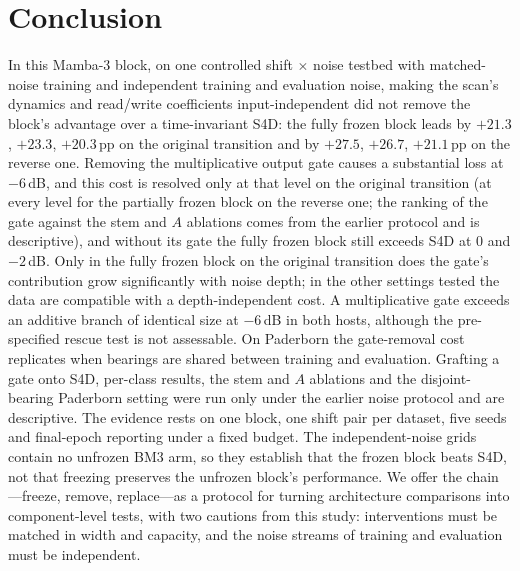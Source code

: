 \section{Conclusion}
\label{sec:conclusion}

In this Mamba-3 block, on one controlled shift $\times$ noise testbed with matched-noise training and independent training and evaluation noise, making the scan's dynamics and read/write coefficients input-independent did not remove the block's advantage over a time-invariant S4D: the fully frozen block leads by $+21.3$, $+23.3$, $+20.3$\,pp on the original transition and by $+27.5$, $+26.7$, $+21.1$\,pp on the reverse one. Removing the multiplicative output gate causes a substantial loss at $-6$\,dB, and this cost is resolved only at that level on the original transition (at every level for the partially frozen block on the reverse one; the ranking of the gate against the stem and $A$ ablations comes from the earlier protocol and is descriptive), and without its gate the fully frozen block still exceeds S4D at $0$ and $-2$\,dB. Only in the fully frozen block on the original transition does the gate's contribution grow significantly with noise depth; in the other settings tested the data are compatible with a depth-independent cost. A multiplicative gate exceeds an additive branch of identical size at $-6$\,dB in both hosts, although the pre-specified rescue test is not assessable. On Paderborn the gate-removal cost replicates when bearings are shared between training and evaluation. Grafting a gate onto S4D, per-class results, the stem and $A$ ablations and the disjoint-bearing Paderborn setting were run only under the earlier noise protocol and are descriptive. The evidence rests on one block, one shift pair per dataset, five seeds and final-epoch reporting under a fixed budget. The independent-noise grids contain no unfrozen BM3 arm, so they establish that the frozen block beats S4D, not that freezing preserves the unfrozen block's performance. We offer the chain---freeze, remove, replace---as a protocol for turning architecture comparisons into component-level tests, with two cautions from this study: interventions must be matched in width and capacity, and the noise streams of training and evaluation must be independent.
